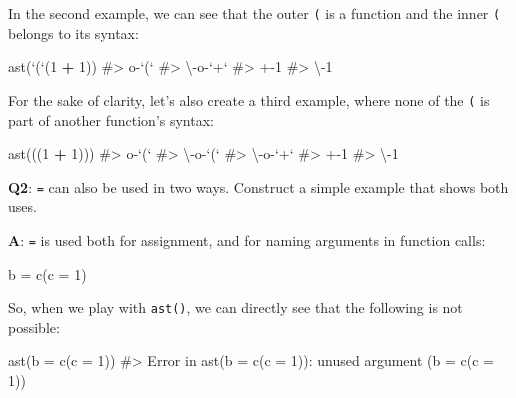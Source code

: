 \documentclass[
]{krantz}
\makeatletter
\newenvironment{Shaded}{\begin{snugshade}}{\end{snugshade}}
\newcommand{\CommentTok}[1]{\textcolor[rgb]{0.56,0.35,0.01}{\textit{#1}}}
\newcommand{\DataTypeTok}[1]{\textcolor[rgb]{0.13,0.29,0.53}{#1}}
\newcommand{\DecValTok}[1]{\textcolor[rgb]{0.00,0.00,0.81}{#1}}
\newcommand{\KeywordTok}[1]{\textcolor[rgb]{0.13,0.29,0.53}{\textbf{#1}}}
\newcommand{\NormalTok}[1]{#1}
\newcommand{\OperatorTok}[1]{\textcolor[rgb]{0.81,0.36,0.00}{\textbf{#1}}}
\newcommand{\StringTok}[1]{\textcolor[rgb]{0.31,0.60,0.02}{#1}}
\newenvironment{kframe}{%
\medskip{}
\setlength{\fboxsep}{.8em}
 \def\at@end@of@kframe{}%
 \ifinner\ifhmode%
  \def\at@end@of@kframe{\end{minipage}}%
  \begin{minipage}{\columnwidth}%
 \fi\fi%
 \def\FrameCommand##1{\hskip\@totalleftmargin \hskip-\fboxsep
 \colorbox{shadecolor}{##1}\hskip-\fboxsep
     \hskip-\linewidth \hskip-\@totalleftmargin \hskip\columnwidth}%
 \MakeFramed {\advance\hsize-\width
   \@totalleftmargin\z@ \linewidth\hsize
   \@setminipage}}%
 {\par\unskip\endMakeFramed%
 \at@end@of@kframe}
\renewenvironment{Shaded}{\begin{kframe}}{\end{kframe}}
\renewcommand{\KeywordTok} [1]{\textcolor[rgb]{0.00,0.44,0.13}{{#1}}}
\renewcommand{\DataTypeTok}[1]{\textcolor[rgb]{0.56,0.13,0.00}{{#1}}}
\renewcommand{\DecValTok}  [1]{\textcolor[rgb]{0.25,0.63,0.44}{{#1}}}
\renewcommand{\StringTok}  [1]{\textcolor[rgb]{0.25,0.44,0.63}{{#1}}}
\renewcommand{\CommentTok} [1]{\textcolor[rgb]{0.38,0.63,0.69}{{#1}}}
\renewcommand{\NormalTok}  [1]{{#1}}
\makeatother
\begin{document}
In the second example, we can see that the outer \texttt{(} is a function and the inner \texttt{(} belongs to its syntax:

\begin{Shaded}
\begin{Highlighting}[]
\KeywordTok{ast}\NormalTok{(}\StringTok{`}\DataTypeTok{(}\StringTok{`}\NormalTok{(}\DecValTok{1} \OperatorTok{+}\StringTok{ }\DecValTok{1}\NormalTok{))}
\CommentTok{#> o-`(` }
\CommentTok{#> \textbackslash{}-o-`+` }
\CommentTok{#>   +-1 }
\CommentTok{#>   \textbackslash{}-1}
\end{Highlighting}
\end{Shaded}

For the sake of clarity, let's also create a third example, where none of the \texttt{(} is part of another function's syntax:

\begin{Shaded}
\begin{Highlighting}[]
\KeywordTok{ast}\NormalTok{(((}\DecValTok{1} \OperatorTok{+}\StringTok{ }\DecValTok{1}\NormalTok{)))}
\CommentTok{#> o-`(` }
\CommentTok{#> \textbackslash{}-o-`(` }
\CommentTok{#>   \textbackslash{}-o-`+` }
\CommentTok{#>     +-1 }
\CommentTok{#>     \textbackslash{}-1}
\end{Highlighting}
\end{Shaded}

\textbf{{Q2}}: \texttt{=} can also be used in two ways. Construct a simple example that shows both uses.

\textbf{{A}}: \texttt{=} is used both for assignment, and for naming arguments in function calls:

\begin{Shaded}
\begin{Highlighting}[]
\NormalTok{b =}\StringTok{ }\KeywordTok{c}\NormalTok{(}\DataTypeTok{c =} \DecValTok{1}\NormalTok{)}
\end{Highlighting}
\end{Shaded}

So, when we play with \texttt{ast()}, we can directly see that the following is not possible:

\begin{Shaded}
\begin{Highlighting}[]
\KeywordTok{ast}\NormalTok{(}\DataTypeTok{b =} \KeywordTok{c}\NormalTok{(}\DataTypeTok{c =} \DecValTok{1}\NormalTok{))}
\CommentTok{#> Error in ast(b = c(c = 1)): unused argument (b = c(c = 1))}
\end{Highlighting}
\end{Shaded}
\end{document}
